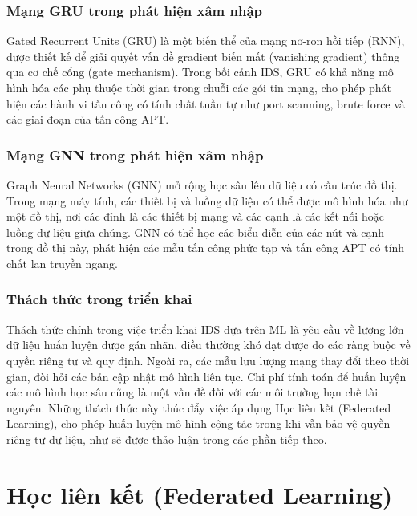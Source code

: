 \subsubsection{Mạng GRU trong phát hiện xâm nhập}
Gated Recurrent Units (GRU) là một biến thể của mạng nơ-ron hồi tiếp (RNN), được thiết kế để giải quyết vấn đề gradient biến mất (vanishing gradient) thông qua cơ chế cổng (gate mechanism). Trong bối cảnh IDS, GRU có khả năng mô hình hóa các phụ thuộc thời gian trong chuỗi các gói tin mạng, cho phép phát hiện các hành vi tấn công có tính chất tuần tự như port scanning, brute force và các giai đoạn của tấn công APT.

\subsubsection{Mạng GNN trong phát hiện xâm nhập}
Graph Neural Networks (GNN) mở rộng học sâu lên dữ liệu có cấu trúc đồ thị. Trong mạng máy tính, các thiết bị và luồng dữ liệu có thể được mô hình hóa như một đồ thị, nơi các đỉnh là các thiết bị mạng và các cạnh là các kết nối hoặc luồng dữ liệu giữa chúng. GNN có thể học các biểu diễn của các nút và cạnh trong đồ thị này, phát hiện các mẫu tấn công phức tạp và tấn công APT có tính chất lan truyền ngang.

\subsubsection{Thách thức trong triển khai}
Thách thức chính trong việc triển khai IDS dựa trên ML là yêu cầu về lượng lớn dữ liệu huấn luyện được gán nhãn, điều thường khó đạt được do các ràng buộc về quyền riêng tư và quy định. Ngoài ra, các mẫu lưu lượng mạng thay đổi theo thời gian, đòi hỏi các bản cập nhật mô hình liên tục. Chi phí tính toán để huấn luyện các mô hình học sâu cũng là một vấn đề đối với các môi trường hạn chế tài nguyên. Những thách thức này thúc đẩy việc áp dụng Học liên kết (Federated Learning), cho phép huấn luyện mô hình cộng tác trong khi vẫn bảo vệ quyền riêng tư dữ liệu, như sẽ được thảo luận trong các phần tiếp theo.

\section{Học liên kết (Federated Learning)}
\label{sec:fl}

